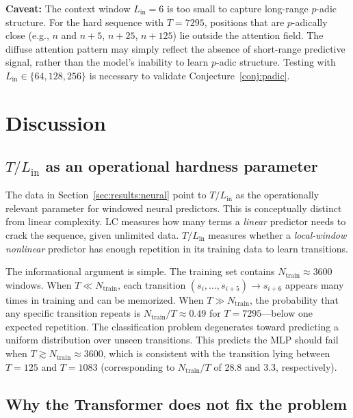 \documentclass[11pt]{article}
\theoremstyle{plain}
\theoremstyle{definition}
\newcommand{\LC}{\mathrm{LC}}
\begin{document}
\textbf{Caveat:} The context window $L_{\mathrm{in}}=6$ is too small to capture long-range $p$-adic structure. For the hard sequence with $T=7295$, positions that are $p$-adically close (e.g., $n$ and $n+5$, $n+25$, $n+125$) lie outside the attention field. The diffuse attention pattern may simply reflect the absence of short-range predictive signal, rather than the model's inability to learn $p$-adic structure. Testing with $L_{\mathrm{in}} \in \{64, 128, 256\}$ is necessary to validate Conjecture~\ref{conj:padic}.

\section{Discussion}
\label{sec:discussion}

\subsection{$T/L_{\mathrm{in}}$ as an operational hardness parameter}

The data in Section~\ref{sec:results:neural} point to $T/L_{\mathrm{in}}$ as the operationally relevant parameter for windowed neural predictors. This is conceptually distinct from linear complexity. $\LC$ measures how many terms a \emph{linear} predictor needs to crack the sequence, given unlimited data. $T/L_{\mathrm{in}}$ measures whether a \emph{local-window nonlinear} predictor has enough repetition in its training data to learn transitions.

The informational argument is simple. The training set contains $N_{\mathrm{train}} \approx 3600$ windows. When $T \ll N_{\mathrm{train}}$, each transition $(s_i,\ldots,s_{i+5}) \to s_{i+6}$ appears many times in training and can be memorized. When $T \gg N_{\mathrm{train}}$, the probability that any specific transition repeats is $N_{\mathrm{train}}/T \approx 0.49$ for $T=7295$---below one expected repetition. The classification problem degenerates toward predicting a uniform distribution over unseen transitions. This predicts the MLP should fail when $T \gtrsim N_{\mathrm{train}} \approx 3600$, which is consistent with the transition lying between $T=125$ and $T=1083$ (corresponding to $N_{\mathrm{train}}/T$ of 28.8 and 3.3, respectively).

\subsection{Why the Transformer does not fix the problem}
\end{document}
